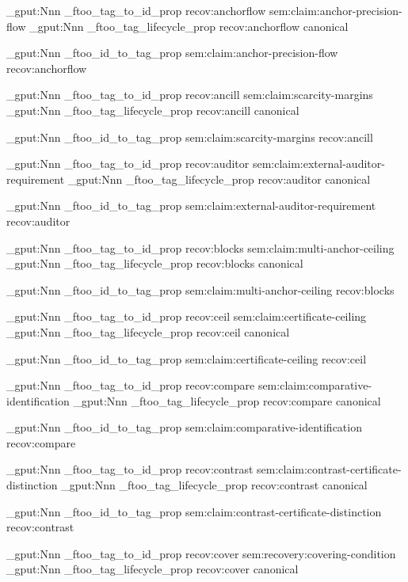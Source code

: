 \prop_gput:Nnn \g_ftoo_tag_to_id_prop { recov:anchorflow } { sem:claim:anchor-precision-flow }
\prop_gput:Nnn \g_ftoo_tag_lifecycle_prop { recov:anchorflow } { canonical }

\prop_gput:Nnn \g_ftoo_id_to_tag_prop { sem:claim:anchor-precision-flow } { recov:anchorflow }


\prop_gput:Nnn \g_ftoo_tag_to_id_prop { recov:ancill } { sem:claim:scarcity-margins }
\prop_gput:Nnn \g_ftoo_tag_lifecycle_prop { recov:ancill } { canonical }

\prop_gput:Nnn \g_ftoo_id_to_tag_prop { sem:claim:scarcity-margins } { recov:ancill }


\prop_gput:Nnn \g_ftoo_tag_to_id_prop { recov:auditor } { sem:claim:external-auditor-requirement }
\prop_gput:Nnn \g_ftoo_tag_lifecycle_prop { recov:auditor } { canonical }

\prop_gput:Nnn \g_ftoo_id_to_tag_prop { sem:claim:external-auditor-requirement } { recov:auditor }


\prop_gput:Nnn \g_ftoo_tag_to_id_prop { recov:blocks } { sem:claim:multi-anchor-ceiling }
\prop_gput:Nnn \g_ftoo_tag_lifecycle_prop { recov:blocks } { canonical }

\prop_gput:Nnn \g_ftoo_id_to_tag_prop { sem:claim:multi-anchor-ceiling } { recov:blocks }


\prop_gput:Nnn \g_ftoo_tag_to_id_prop { recov:ceil } { sem:claim:certificate-ceiling }
\prop_gput:Nnn \g_ftoo_tag_lifecycle_prop { recov:ceil } { canonical }

\prop_gput:Nnn \g_ftoo_id_to_tag_prop { sem:claim:certificate-ceiling } { recov:ceil }


\prop_gput:Nnn \g_ftoo_tag_to_id_prop { recov:compare } { sem:claim:comparative-identification }
\prop_gput:Nnn \g_ftoo_tag_lifecycle_prop { recov:compare } { canonical }

\prop_gput:Nnn \g_ftoo_id_to_tag_prop { sem:claim:comparative-identification } { recov:compare }


\prop_gput:Nnn \g_ftoo_tag_to_id_prop { recov:contrast } { sem:claim:contrast-certificate-distinction }
\prop_gput:Nnn \g_ftoo_tag_lifecycle_prop { recov:contrast } { canonical }

\prop_gput:Nnn \g_ftoo_id_to_tag_prop { sem:claim:contrast-certificate-distinction } { recov:contrast }


\prop_gput:Nnn \g_ftoo_tag_to_id_prop { recov:cover } { sem:recovery:covering-condition }
\prop_gput:Nnn \g_ftoo_tag_lifecycle_prop { recov:cover } { canonical }

